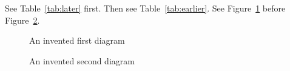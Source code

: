 See Table~\ref{tab:later} first.
Then see Table~\ref{tab:earlier}.
See Figure~\ref{fig:earlier} before Figure~\ref{fig:later}.
\begin{table}\caption{An invented second result}\label{tab:later}\end{table}
\begin{table}\caption{An invented first result}\label{tab:earlier}\end{table}
\begin{figure}\caption{An invented first diagram}\label{fig:earlier}\end{figure}
\begin{figure}\caption{An invented second diagram}\label{fig:later}\end{figure}
\nocite{*}
